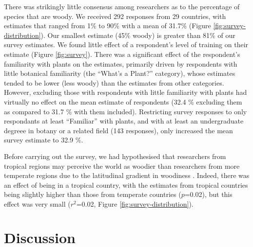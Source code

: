 \documentclass[a4paper,12pt]{article}
\begin{document}
There was strikingly little consensus among researchers as to the
percentage of species that are woody.  We received 292 responses from
29 countries, with estimates that ranged from 1\% to 90\% with a mean
of 31.7\% (Figure \ref{fig:survey-distribution}).  Our smallest
estimate (45\% woody) is greater than 81\% of our survey estimates.
We found little effect of a respondent's level of training on their
estimate (Figure \ref{fig:survey}).  There was a significant effect of
the respondent's familiarity with plants on the estimates, primarily
driven by respondents with little botanical familiarity (the ``What's
a Plant?'' category), whose estimates tended to be lower (less woody)
than the estimates from other categories. However, excluding those with
respondents with little familiarity with plants had virtually no effect
on the mean estimate of respondents (32.4 \% excluding them as compared
to 31.7 \% with them included).
Restricting survey responses to only respondants at least ``Familiar''
with plants, and with at least an undergraduate degreee in botany or a
related field (143 responses), only increased the mean survey estimate
to 32.9 \%.

Before carrying out the survey, we had hypothesised that researchers
from tropical regions may perceive the world as woodier than
researchers from more temperate regions due to the latitudinal
gradient in woodiness \citep{Molesheihgt}.
%
Indeed, there was an effect of being in a tropical country, with the
estimates from tropical countries being slightly higher than those
from temperate countries ($p$=0.02), but this effect was very small
($r^2$=0.02, Figure \ref{fig:survey-distribution}).

\section{Discussion}
\end{document}
